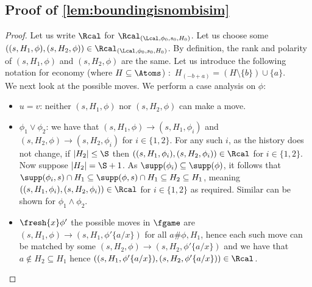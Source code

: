 \subsection{Proof of \cref{lem:boundingisnombisim}}

\boundingisnombisim
\begin{proof}
  Let us write $\Rcal$ for $\Rcal_{(\Lcal, \phi_0, s_0, H_0)}$.
Let us choose some $((s, H_1, \phi),(s, H_2, \phi)) \in \Rcal_{(\Lcal, \phi_0, s_0, H_0)}$. By definition, the rank and polarity of $(s, H_1, \phi)$ and $(s, H_2, \phi)$ are the same.
Let us introduce the following notation for economy (where $ H \subseteq \Atoms$) :\
        $ H_{(-b+a)} = ( H \setminus \{b\}) \cup \{a\}$.\\
        We next look at the possible moves.
We perform a case analysis on $\phi$:
    \begin{itemize}
        \item $u = v$: neither $(s, H_1, \phi)$ nor $(s, H_2, \phi)$ can make a move.
        \item $\phi_1 \lor \phi_2$: we have that $(s, H_1, \phi) \rightarrow (s, H_1, \phi_i)$ and $(s, H_2, \phi) \rightarrow (s, H_2, \phi_i)$ for $i \in \{1, 2\}$. 
        For any such $i$, as the history does not change, if $|H_2| \le \S $ then $((s, H_1, \phi_i), (s, H_2, \phi_i)) \in \Rcal$ for $i \in \{1,2\}$. 
        Now suppose $|H_2| = \S + 1$. 
        As $\supp(\phi_i) \subseteq \supp(\phi)$, it follows that $\supp(\phi_i, s) \cap H_1 \subseteq \supp(\phi, s) \cap H_1 \subseteq H_2 \subseteq H_1$, meaning $((s, H_1, \phi_i),(s, H_2, \phi_i)) \in \Rcal$ for $i \in \{1,2\}$ as required.
        Similar can be shown for $\phi_1 \land \phi_2$.
        \item $\fresh{x} \phi'$ the possible moves in $\fgame$ are $(s, H_1, \phi)\rightarrow (s, H_1, \phi'\{a/x\})$ for all $a \# \phi,H_1$, hence each such move can be matched by some $(s, H_2, \phi) \rightarrow (s, H_2, \phi'\{a/x\})$ and we have that $a \notin H_2 \subseteq H_1$ hence $((s, H_1, \phi'\{a/x\}),(s, H_2, \phi'\{a/x\})) \in \Rcal$. 
        \\

\end{itemize}
\end{proof}
